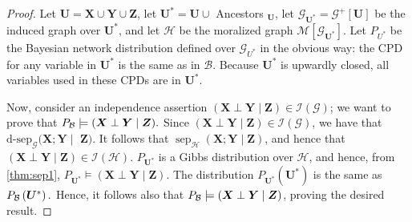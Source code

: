\documentclass{article}
\begin{document}
\begin{proof}
Let $\boldsymbol{U}=\boldsymbol{X} \cup \boldsymbol{Y} \cup \boldsymbol{Z}$, let $\boldsymbol{U}^{*}=\boldsymbol{U} \cup$ Ancestors $_{\boldsymbol{U}}$, let $\mathcal{G}_{\boldsymbol{U}^{*}}=\mathcal{G}^{+}[\boldsymbol{U}]$ be the induced graph over $\boldsymbol{U}^{*}$, and let $\mathcal{H}$ be the moralized graph $\mathcal{M}\left[\mathcal{G}_{\boldsymbol{U}^{*}}\right]$. Let $P_{U^{*}}$ be the Bayesian network distribution defined over $\mathcal{G}_{U^{*}}$ in the obvious way: the CPD for any variable in $\boldsymbol{U}^{*}$ is the same as in $\mathcal{B}$. Because $\boldsymbol{U}^{*}$ is upwardly closed, all variables used in these CPDs are in $\boldsymbol{U}^{*}$.

Now, consider an independence assertion $(\boldsymbol{X} \perp \boldsymbol{Y} \mid \boldsymbol{Z}) \in \mathcal{I}(\mathcal{G})$; we want to prove that $P_{\mathcal{B}} \models(\boldsymbol{X} \perp \boldsymbol{Y} \mid \boldsymbol{Z}) .$ Since $(\boldsymbol{X} \perp \boldsymbol{Y} \mid \boldsymbol{Z}) \in \mathcal{I}(\mathcal{G})$, we have that $\text{$\mathrm{d}$-$\mathrm{sep}$}_{\mathcal{G}}(\boldsymbol{X} ; \boldsymbol{Y} \mid$ $\boldsymbol{Z})$. It follows that $\operatorname{sep}_{\mathcal{H}}(\boldsymbol{X} ; \boldsymbol{Y} \mid \boldsymbol{Z})$, and hence that $(\boldsymbol{X} \perp \boldsymbol{Y} \mid \boldsymbol{Z}) \in \mathcal{I}(\mathcal{H})$.  $P_{\boldsymbol{U}^{*}}$ is a Gibbs distribution over $\mathcal{H}$, and hence, from \cref{thm:sep1}, $P_{\boldsymbol{U}^{*}} \models(\boldsymbol{X} \perp \boldsymbol{Y} \mid \boldsymbol{Z})$. The distribution $P_{\boldsymbol{U}^{*}}\left(\boldsymbol{U}^{*}\right)$ is the same as $P_{\mathcal{B}}\left(\boldsymbol{U}^{*}\right) .$ Hence, it follows also that $P_{\mathcal{B}} \models(\boldsymbol{X} \perp \boldsymbol{Y} \mid \boldsymbol{Z})$, proving the desired result.
\end{proof} 
\end{document}

